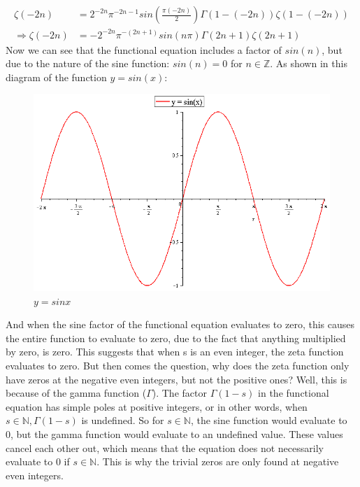\documentclass[12pt]{article}
\begin{document}
\begin{align*}
    \zeta(-2n) &= 2^{-2n}\pi^{-2n-1}sin\left(\frac{\pi(-2n)}{2}\right)\Gamma(1-(-2n))\zeta(1-(-2n))\\
    \Rightarrow \zeta(-2n) &= -2^{-2n}\pi^{-(2n+1)}sin(n \pi)\Gamma(2n+1)\zeta(2n+1)
\end{align*}
Now we can see that the functional equation includes a factor of $sin(n)$, but due to the nature of the sine function: $sin(n) = 0$ for $n \in  \mathbb{Z}$.  As shown in this diagram of the function $y = sin(x)$:

\clearpage

\begin{figure}[ht]
    \centering
    \includegraphics[scale=0.3]{sinx-graph}
    \caption{$y=sin x$}
\end{figure}

And when the sine factor of the functional equation evaluates to zero, this causes the entire function to evaluate to zero, due to the fact that anything multiplied by zero, is zero. This suggests that when s is an even integer, the zeta function evaluates to zero. But then comes the question, why does the zeta function only have zeros at the negative even integers, but not the positive ones? Well, this is because of the gamma function ($\Gamma$).  The factor $\Gamma(1-s)$ in the functional equation has simple poles at positive integers, or in other words, when $s \in \mathbb{N}, \Gamma(1-s)$ is undefined. So for $s \in \mathbb{N}$, the sine function would evaluate to 0, but the gamma function would evaluate to an undefined value. These values cancel each other out, which means that the equation does not necessarily evaluate to $0$ if  $s \in \mathbb{N}$. This is why the trivial zeros are only found at negative even integers.
\end{document}
